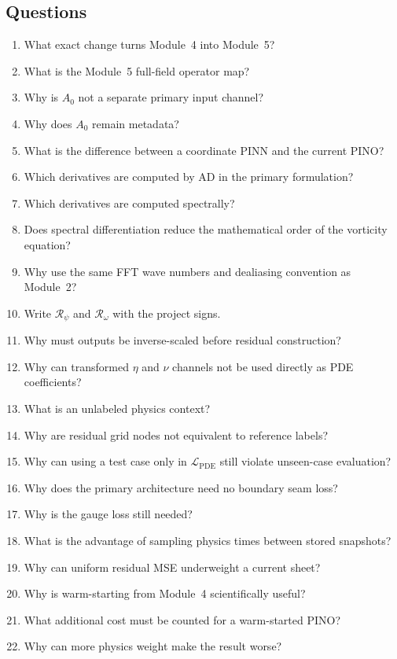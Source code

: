 \documentclass[11pt]{article}
\newcommand{\Rpsi}{\mathcal{R}_{\psi}}
\newcommand{\Romega}{\mathcal{R}_{\omega}}
\newcommand{\Lpde}{\mathcal{L}_{\mathrm{PDE}}}
\begin{document}
\subsection*{Questions}
\begin{enumerate}[label=\textbf{Q\arabic*.}]
  \item What exact change turns Module~4 into Module~5?
  \item What is the Module~5 full-field operator map?
  \item Why is $A_0$ not a separate primary input channel?
  \item Why does $A_0$ remain metadata?
  \item What is the difference between a coordinate PINN and the current PINO?
  \item Which derivatives are computed by AD in the primary formulation?
  \item Which derivatives are computed spectrally?
  \item Does spectral differentiation reduce the mathematical order of the vorticity equation?
  \item Why use the same FFT wave numbers and dealiasing convention as Module~2?
  \item Write $\Rpsi$ and $\Romega$ with the project signs.
  \item Why must outputs be inverse-scaled before residual construction?
  \item Why can transformed $\eta$ and $\nu$ channels not be used directly as PDE coefficients?
  \item What is an unlabeled physics context?
  \item Why are residual grid nodes not equivalent to reference labels?
  \item Why can using a test case only in $\Lpde$ still violate unseen-case evaluation?
  \item Why does the primary architecture need no boundary seam loss?
  \item Why is the gauge loss still needed?
  \item What is the advantage of sampling physics times between stored snapshots?
  \item Why can uniform residual MSE underweight a current sheet?
  \item Why is warm-starting from Module~4 scientifically useful?
  \item What additional cost must be counted for a warm-started PINO?
  \item Why can more physics weight make the result worse?

\end{enumerate}
\end{document}
